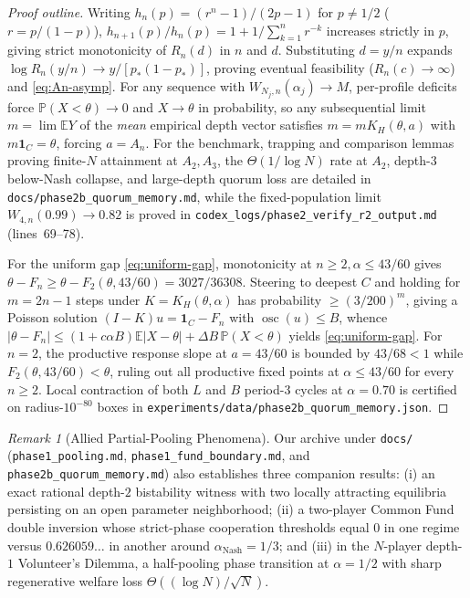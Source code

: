 \documentclass[11pt,reqno]{amsart}
\theoremstyle{definition}
\theoremstyle{remark}
\newtheorem{remark}[theorem]{Remark}
\newcommand{\E}{\mathbb{E}}
\newcommand{\Prob}{\mathbb{P}}
\newcommand{\one}{\mathbf{1}}
\DeclareMathOperator{\osc}{osc}
\begin{document}
\begin{proof}[Proof outline]
Writing $h_n(p) = (r^n - 1)/(2p - 1)$ for $p \neq 1/2$ ($r = p/(1-p)$), $h_{n+1}(p)/h_n(p) = 1 + 1/\sum_{k=1}^n r^{-k}$ increases strictly in $p$, giving strict monotonicity of $R_n(d)$ in $n$ and $d$. Substituting $d = y/n$ expands $\log R_n(y/n) \to y/[p_*(1-p_*)]$, proving eventual feasibility ($R_n(c) \to \infty$) and \eqref{eq:An-asymp}. For any sequence with $W_{N_j,n}(\alpha_j) \to M$, per-profile deficits force $\Prob(X<\theta)\to 0$ and $X \to \theta$ in probability, so any subsequential limit $m = \lim \E Y$ of the \emph{mean} empirical depth vector satisfies $m = m K_H(\theta, a)$ with $m \one_C = \theta$, forcing $a = A_n$. For the benchmark, trapping and comparison lemmas proving finite-$N$ attainment at $A_2, A_3$, the $\Theta(1/\log N)$ rate at $A_2$, depth-$3$ below-Nash collapse, and large-depth quorum loss are detailed in \texttt{docs/phase2b\_quorum\_memory.md}, while the fixed-population limit $W_{4,n}(0.99) \to 0.82$ is proved in \texttt{codex\_logs/phase2\_verify\_r2\_output.md} (lines~69--78).

For the uniform gap \eqref{eq:uniform-gap}, monotonicity at $n \ge 2, \alpha \le 43/60$ gives $\theta - F_n \ge \theta - F_2(\theta, 43/60) = 3027/36308$. Steering to deepest $C$ and holding for $m = 2n-1$ steps under $K = K_H(\theta,\alpha)$ has probability $\ge (3/200)^m$, giving a Poisson solution $(I-K)u = \one_C - F_n$ with $\osc(u) \le B$, whence $|\theta - F_n| \le (1 + c\alpha B)\E|X-\theta| + \Delta B\,\Prob(X<\theta)$ yields \eqref{eq:uniform-gap}. For $n=2$, the productive response slope at $a=43/60$ is bounded by $43/68 < 1$ while $F_2(\theta, 43/60) < \theta$, ruling out all productive fixed points at $\alpha \le 43/60$ for every $n \ge 2$. Local contraction of both $L$ and $B$ period-$3$ cycles at $\alpha=0.70$ is certified on radius-$10^{-80}$ boxes in \texttt{experiments/data/phase2b\_quorum\_memory.json}.
\end{proof}

\begin{remark}[Allied Partial-Pooling Phenomena]
Our archive under \texttt{docs/} (\texttt{phase1\_pooling.md}, \texttt{phase1\_fund\_boundary.md}, and \texttt{phase2b\_quorum\_memory.md}) also establishes three companion results: (i) an exact rational depth-$2$ bistability witness with two locally attracting equilibria persisting on an open parameter neighborhood; (ii) a two-player Common Fund double inversion whose strict-phase cooperation thresholds equal $0$ in one regime versus $0.626059\dots$ in another around $\alpha_{\mathrm{Nash}} = 1/3$; and (iii) in the $N$-player depth-$1$ Volunteer's Dilemma, a half-pooling phase transition at $\alpha = 1/2$ with sharp regenerative welfare loss $\Theta((\log N)/\sqrt{N})$.
\end{remark}
\end{document}
